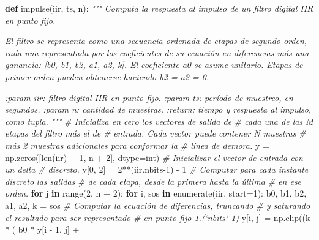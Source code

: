 \documentclass[11pt]{article}
\newenvironment{Shaded}{}{}
\newcommand{\KeywordTok}[1]{\textcolor[rgb]{0.00,0.44,0.13}{\textbf{{#1}}}}
\newcommand{\DecValTok}[1]{\textcolor[rgb]{0.25,0.63,0.44}{{#1}}}
\newcommand{\CommentTok}[1]{\textcolor[rgb]{0.38,0.63,0.69}{\textit{{#1}}}}
\newcommand{\NormalTok}[1]{{#1}}
\newcommand{\ControlFlowTok}[1]{\textcolor[rgb]{0.00,0.44,0.13}{\textbf{{#1}}}}
\newcommand{\OperatorTok}[1]{\textcolor[rgb]{0.40,0.40,0.40}{{#1}}}
\newcommand{\BuiltInTok}[1]{{#1}}
\begin{document}
\begin{Shaded}
\begin{Highlighting}[]
\KeywordTok{def}\NormalTok{ impulse(iir, ts, n):}
    \CommentTok{"""}
\CommentTok{    Computa la respuesta al impulso de un filtro digital IIR}
\CommentTok{    en punto fijo.}

\CommentTok{    El filtro se representa como una secuencia ordenada de}
\CommentTok{    etapas de segundo orden, cada una representada por los}
\CommentTok{    coeficientes de su ecuación en diferencias más una}
\CommentTok{    ganancia: [b0, b1, b2, a1, a2, k]. El coeficiente a0 se}
\CommentTok{    asume unitario. Etapas de primer orden pueden obtenerse}
\CommentTok{    haciendo b2 = a2 = 0.}

\CommentTok{    :param iir: filtro digital IIR en punto fijo.}
\CommentTok{    :param ts: período de muestreo, en segundos.}
\CommentTok{    :param n: cantidad de muestras.}
\CommentTok{    :return: tiempo y respuesta al impulso, como tupla.}
\CommentTok{    """}
    \CommentTok{# Inicializa en cero los vectores de salida de}
    \CommentTok{# cada una de las M etapas del filtro más el de}
    \CommentTok{# entrada. Cada vector puede contener N muestras}
    \CommentTok{# más 2 muestras adicionales para conformar la}
    \CommentTok{# línea de demora.}
\NormalTok{    y }\OperatorTok{=}\NormalTok{ np.zeros([}\BuiltInTok{len}\NormalTok{(iir) }\OperatorTok{+} \DecValTok{1}\NormalTok{, n }\OperatorTok{+} \DecValTok{2}\NormalTok{], dtype}\OperatorTok{=}\BuiltInTok{int}\NormalTok{)}
    \CommentTok{# Inicializar el vector de entrada con un delta}
    \CommentTok{# discreto.}
\NormalTok{    y[}\DecValTok{0}\NormalTok{, }\DecValTok{2}\NormalTok{] }\OperatorTok{=} \DecValTok{2}\OperatorTok{**}\NormalTok{(iir.nbits}\DecValTok{-1}\NormalTok{) }\OperatorTok{-} \DecValTok{1}
    \CommentTok{# Computar para cada instante discreto las salidas}
    \CommentTok{# de cada etapa, desde la primera hasta la última}
    \CommentTok{# en ese orden.}
    \ControlFlowTok{for}\NormalTok{ j }\KeywordTok{in} \BuiltInTok{range}\NormalTok{(}\DecValTok{2}\NormalTok{, n }\OperatorTok{+} \DecValTok{2}\NormalTok{):}
        \ControlFlowTok{for}\NormalTok{ i, sos }\KeywordTok{in} \BuiltInTok{enumerate}\NormalTok{(iir, start}\OperatorTok{=}\DecValTok{1}\NormalTok{):}
\NormalTok{            b0, b1, b2, a1, a2, k }\OperatorTok{=}\NormalTok{ sos}
            \CommentTok{# Computar la ecuación de diferencias, truncando}
            \CommentTok{# y saturando el resultado para ser representado}
            \CommentTok{# en punto fijo 1.(`nbits`-1)}
\NormalTok{            y[i, j] }\OperatorTok{=}\NormalTok{ np.clip((k }\OperatorTok{*}\NormalTok{ (}
\NormalTok{                b0 }\OperatorTok{*}\NormalTok{ y[i }\OperatorTok{-} \DecValTok{1}\NormalTok{, j] }\OperatorTok{+}

\end{Highlighting}
\end{Shaded}
\end{document}
